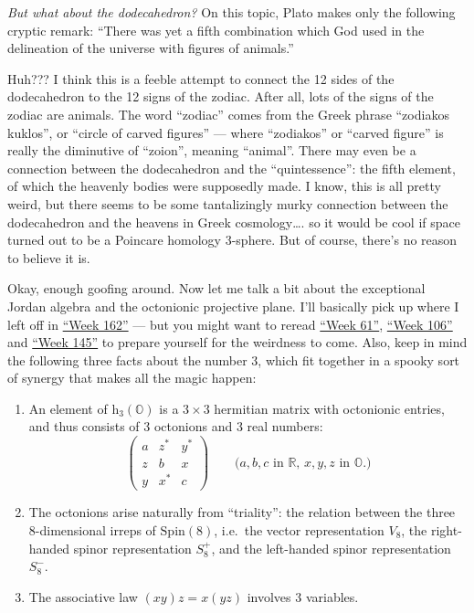 \documentclass{article}
\begin{document}
\emph{But what about the dodecahedron?} On this topic, Plato makes only
the following cryptic remark: ``There was yet a fifth combination which
God used in the delineation of the universe with figures of animals.''

Huh??? I think this is a feeble attempt to connect the 12 sides of the
dodecahedron to the 12 signs of the zodiac. After all, lots of the signs
of the zodiac are animals. The word ``zodiac'' comes from the Greek
phrase ``zodiakos kuklos'', or ``circle of carved figures'' --- where
``zodiakos'' or ``carved figure'' is really the diminutive of ``zoion'',
meaning ``animal''. There may even be a connection between the
dodecahedron and the ``quintessence'': the fifth element, of which the
heavenly bodies were supposedly made. I know, this is all pretty weird,
but there seems to be some tantalizingly murky connection between the
dodecahedron and the heavens in Greek cosmology\ldots. so it would be
cool if space turned out to be a Poincare homology 3-sphere. But of
course, there's no reason to believe it is.

Okay, enough goofing around. Now let me talk a bit about the exceptional
Jordan algebra and the octonionic projective plane. I'll basically pick
up where I left off in \protect\hyperlink{week162}{``Week 162''} --- but
you might want to reread \protect\hyperlink{week61}{``Week 61''},
\protect\hyperlink{week106}{``Week 106''} and
\protect\hyperlink{week145}{``Week 145''} to prepare yourself for the
weirdness to come. Also, keep in mind the following three facts about
the number 3, which fit together in a spooky sort of synergy that makes
all the magic happen:

\begin{enumerate}
\def\labelenumi{\roman{enumi})}
\item
  An element of \(\mathrm{h}_3(\mathbb{O})\) is a \(3\times3\) hermitian
  matrix with octonionic entries, and thus consists of 3 octonions and 3
  real numbers: \[
     \left(
       \begin{array}{ccc}
         a&z^*&y^*
       \\z&b&x
       \\y&x^*&c
       \end{array}
     \right)
     \qquad\mbox{($a,b,c$ in $\mathbb{R}$, $x,y,z$ in $\mathbb{O}$.)}
   \]
\item
  The octonions arise naturally from ``triality'': the relation between
  the three 8-dimensional irreps of \(\mathrm{Spin}(8)\), i.e.~the
  vector representation \(V_8\), the right-handed spinor representation
  \(S_8^+\), and the left-handed spinor representation \(S_8^-\).
\item
  The associative law \((xy)z = x(yz)\) involves 3 variables.
\end{enumerate}
\end{document}
